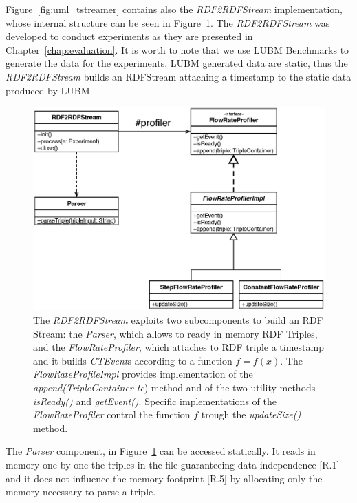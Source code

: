 Figure~\ref{fig:uml_tstreamer} contains also the \textit{RDF2RDFStream} implementation, whose internal structure can be seen in Figure~\ref{fig:uml_flowrateprofiler}. The \textit{RDF2RDFStream} was developed to conduct experiments as they are presented in Chapter~\ref{chap:evaluation}.  It is worth to note that we use LUBM Benchmarks to generate the data for the experiments. LUBM generated data are static, thus the \textit{RDF2RDFStream} builds an RDFStream attaching a timestamp to the static data produced by LUBM. %

\begin{figure}[tbh]
  \centering
	\includegraphics[width=0.75\linewidth]{images/uml_flowrateprofiler}
	\caption[Internal Components of \textit{RDF2RDFStream} - UML Schema]{The \textit{RDF2RDFStream} exploits two subcomponents to build an RDF Stream: the \textit{Parser}, which allows to ready in memory RDF Triples, and the \textit{FlowRateProfiler}, which attaches to RDF triple a timestamp and it builds \textit{CTEvent}s according to a function $f=f(x)$. The \textit{FlowRateProfileImpl} provides implementation of the \textit{append(TripleContainer tc}) method and of the two utility methods \textit{isReady()} and \textit{getEvent()}. Specific implementations of the \textit{FlowRateProfiler} control the function $f$ trough the \textit{updateSize()} method.} 
  	\label{fig:uml_flowrateprofiler}
\end{figure}


The \textit{Parser} component, in Figure~\ref{fig:uml_flowrateprofiler} can be accessed statically. It reads in memory one by one the triples in the file guaranteeing data independence [R.1] and it does not influence the memory footprint [R.5] by allocating only the memory necessary to parse a triple. 

